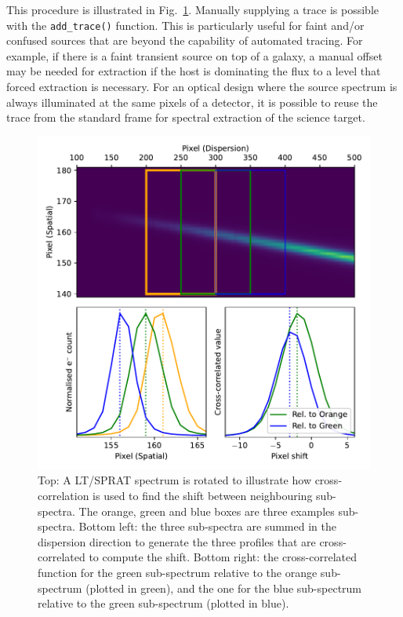 \documentclass[twocolumn, linenumbers]{aastex631}
\begin{document}
This procedure is illustrated in Fig.~\ref{fig:trace}. Manually
supplying a trace is possible with the \texttt{add\_trace()}
function. This is particularly useful for faint and/or confused
sources that are beyond the capability of automated tracing. For
example, if there is a faint transient source on top of a galaxy,
a manual offset may be needed for extraction if the host is
dominating the flux to a level that forced extraction is necessary.
For an optical design where the source spectrum is always illuminated
at the same pixels of a detector, it is possible to reuse the trace
from the standard frame for spectral extraction of the science target.

\begin{figure}
    \centering
    \includegraphics[width=\columnwidth]{fig_01_tracing.pdf}
    \caption{Top: A LT/SPRAT spectrum is rotated to illustrate how
    cross-correlation is used to find the shift between neighbouring
    sub-spectra. The orange, green and blue boxes are three examples
    sub-spectra. Bottom left: the three sub-spectra are summed in
    the dispersion direction to generate the three profiles that are
    cross-correlated to compute the shift. Bottom right: the
    cross-correlated function for the green sub-spectrum relative
    to the orange sub-spectrum (plotted in green), and the one
    for the blue sub-spectrum relative to the green sub-spectrum
    (plotted in blue).}
    \label{fig:trace}
\end{figure}
\end{document}
